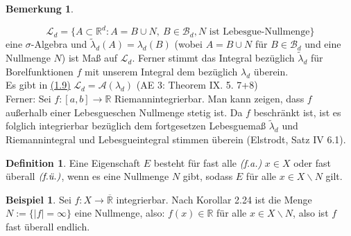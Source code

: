 \documentclass[a4paper]{report}
\newcommand{\R}{\mathbb{R}}
\newcommand{\Rq}{\overline{\R}}
\newcommand{\Borel}{\mathcal{B}}
\newcommand{\Bd}{\Borel_d}
\newcommand{\Leb}{\mathcal{L}}
\newcommand{\jlabel}[1]{\label{j_#1}}
\newcommand{\jhyperref}[2]{\hyperref[j_#1]{#2}}
\newcommand{\jlink}[1]{\jhyperref{#1}{#1}}
\newcommand{\fu}{\text{\textit{(f.ü.)}}}
\newcommand{\jabb}[3]{ #1: #2 \rightarrow #3 }
\theoremstyle{plain}
\theoremstyle{definition}
\newtheorem{defn}[thm]{Definition}
\newtheorem{expl}[thm]{Beispiel}
\newtheorem{bem}[thm]{Bemerkung}
\begin{document}
{{{{\begin{bem}
\begin{enumerate}
            \begin{displaymath}
                \Leb_d = \{A \subset \R^d: A = B\cup N,\ B\in \Bd, N \text{ ist Lebesgue-Nullmenge}\}
            \end{displaymath}
            eine $\sigma$-Algebra und $\tilde{\lambda}_d(A) = \lambda_d(B)$ (wobei $A= B\cup N$ für $B\in \Bd$ und eine Nullmenge $N$) ist Maß auf $\Leb_d$. Ferner stimmt das Integral bezüglich $\tilde{\lambda}_d$ für Borelfunktionen $f$ mit unserem Integral dem bezüglich $\lambda_d$ überein.\\
            Es gibt in \jlink{(1.9)} $\Leb_d = \mathcal{A}(\lambda_d)$ (AE 3: Theorem IX. 5. 7+8)\\
            Ferner: Sei $\jabb{f}{[a,b]}{\R}$ Riemannintegrierbar. Man kann zeigen, dass $f$ außerhalb einer Lebesgueschen Nullmenge stetig ist. Da $f$ beschränkt ist, ist es folglich integrierbar bezüglich dem fortgesetzen Lebesguemaß $\tilde{\lambda}_d$ und Riemannintegral und Lebesgueintegral stimmen überein (Elstrodt, Satz IV 6.1).
    \end{enumerate}
\end{bem}

\begin{defn}
\jlabel{Def 3.3}
    Eine Eigenschaft $E$ besteht für fast alle \textit{(f.a.)} $x\in X$ oder fast überall $\fu$, wenn es eine Nullmenge $N$ gibt, sodass $E$ für alle $x\in X\backslash N$ gilt.
\end{defn}

\begin{expl}
\jlabel{Bsp 3.4}
    Sei $\jabb{f}{X}{\Rq}$ integrierbar. Nach Korollar 2.24 ist die Menge $N:= \{|f| = \infty\}$ eine Nullmenge, also: $f(x) \in \R$ für alle $x\in X\backslash N$, also ist $f$ fast überall endlich.
\end{expl}


}}}}
\end{document}
